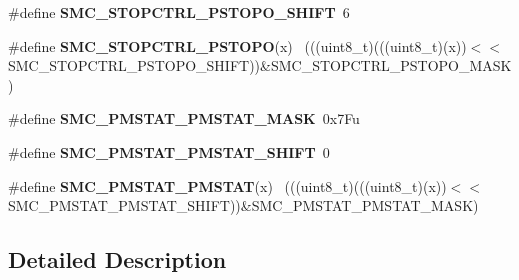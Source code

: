 \begin{DoxyCompactItemize}
\item 
\hypertarget{group___s_m_c___register___masks_gac99e62cd86e9c12454c78fd6d5e3dc75}{}\#define {\bfseries S\+M\+C\+\_\+\+S\+T\+O\+P\+C\+T\+R\+L\+\_\+\+P\+S\+T\+O\+P\+O\+\_\+\+S\+H\+I\+F\+T}~6\label{group___s_m_c___register___masks_gac99e62cd86e9c12454c78fd6d5e3dc75}

\item 
\hypertarget{group___s_m_c___register___masks_ga9eefc52cef69805df094d1dad86183bb}{}\#define {\bfseries S\+M\+C\+\_\+\+S\+T\+O\+P\+C\+T\+R\+L\+\_\+\+P\+S\+T\+O\+P\+O}(x)                                  ~(((uint8\+\_\+t)(((uint8\+\_\+t)(x))$<$$<$S\+M\+C\+\_\+\+S\+T\+O\+P\+C\+T\+R\+L\+\_\+\+P\+S\+T\+O\+P\+O\+\_\+\+S\+H\+I\+F\+T))\&S\+M\+C\+\_\+\+S\+T\+O\+P\+C\+T\+R\+L\+\_\+\+P\+S\+T\+O\+P\+O\+\_\+\+M\+A\+S\+K)\label{group___s_m_c___register___masks_ga9eefc52cef69805df094d1dad86183bb}

\item 
\hypertarget{group___s_m_c___register___masks_ga2574f973caed7a43c1d0b69888866f63}{}\#define {\bfseries S\+M\+C\+\_\+\+P\+M\+S\+T\+A\+T\+\_\+\+P\+M\+S\+T\+A\+T\+\_\+\+M\+A\+S\+K}~0x7\+Fu\label{group___s_m_c___register___masks_ga2574f973caed7a43c1d0b69888866f63}

\item 
\hypertarget{group___s_m_c___register___masks_gaa4083ab43677e6a1b6832f6607a5ef0e}{}\#define {\bfseries S\+M\+C\+\_\+\+P\+M\+S\+T\+A\+T\+\_\+\+P\+M\+S\+T\+A\+T\+\_\+\+S\+H\+I\+F\+T}~0\label{group___s_m_c___register___masks_gaa4083ab43677e6a1b6832f6607a5ef0e}

\item 
\hypertarget{group___s_m_c___register___masks_gaf42160e08664669fce172fdc170e9c5f}{}\#define {\bfseries S\+M\+C\+\_\+\+P\+M\+S\+T\+A\+T\+\_\+\+P\+M\+S\+T\+A\+T}(x)                                      ~(((uint8\+\_\+t)(((uint8\+\_\+t)(x))$<$$<$S\+M\+C\+\_\+\+P\+M\+S\+T\+A\+T\+\_\+\+P\+M\+S\+T\+A\+T\+\_\+\+S\+H\+I\+F\+T))\&S\+M\+C\+\_\+\+P\+M\+S\+T\+A\+T\+\_\+\+P\+M\+S\+T\+A\+T\+\_\+\+M\+A\+S\+K)\label{group___s_m_c___register___masks_gaf42160e08664669fce172fdc170e9c5f}

\end{DoxyCompactItemize}


\subsection{Detailed Description}
